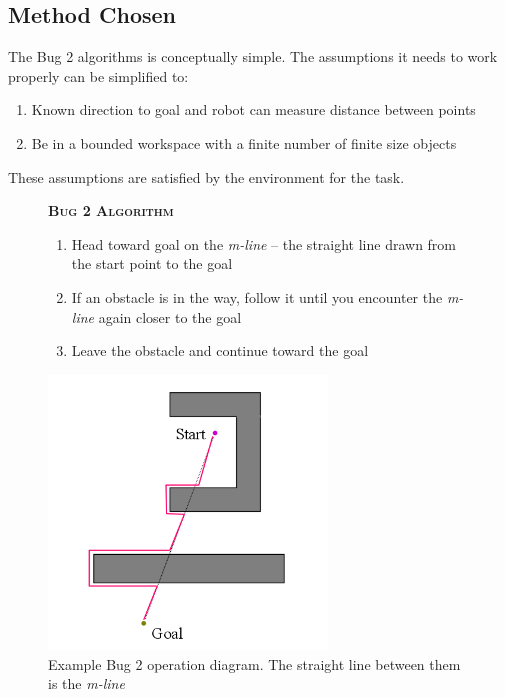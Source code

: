 \documentclass[11pt, a4paper]{article}
\begin{document}


\subsection{Method Chosen}

The Bug 2 algorithms is conceptually simple. The assumptions it needs to work properly can 
be simplified to:

\begin{enumerate}

	\item Known direction to goal and robot can measure distance between points
	\item Be in a bounded workspace with a finite number of finite size objects

\end{enumerate}

These assumptions are satisfied by the environment for the task.

\begin{figure}[H]
  \textbf{\scshape Bug 2 Algorithm}
  
  \begin{enumerate}
    
  \item Head toward goal on the \textit{m-line} -- the straight line drawn from the start point to the goal
  \item If an obstacle is in the way, follow it until you encounter the \textit{m-line} again closer to the goal
  \item Leave the obstacle and continue toward the goal
    
  \end{enumerate}
\end{figure}

\begin{figure}[H]
  \begin{center}
    \includegraphics[width=20em]{../assets/bug-algorithm-diagram.png}
    \caption{Example Bug 2 operation diagram.
      The straight line between them is the \textit{m-line}}
  \end{center}
\end{figure}
\end{document}
